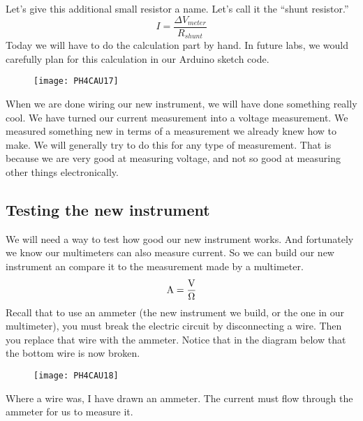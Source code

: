 Let's give this additional small resistor a name. Let's call it the
\textquotedblleft shunt resistor.\textquotedblright\ 
\begin{equation*}
I=\frac{\Delta V_{meter}}{R_{shunt}}
\end{equation*}%
Today we will have to do the calculation part by hand. In future labs, we
would carefully plan for this calculation in our Arduino sketch code.

\begin{figure}[h!]
\texttt{[image: PH4CAU17]}
\end{figure}

When we are done wiring our new instrument, we will have done something
really cool. We have turned our current measurement into a voltage
measurement. We measured something new in terms of a measurement we already
knew how to make. We will generally try to do this for any type of
measurement. That is because we are very good at measuring voltage, and not
so good at measuring other things electronically.

\subsection{Testing the new instrument}

We will need a way to test how good our new instrument works. And
fortunately we know our multimeters can also measure current. So we can
build our new instrument an compare it to the measurement made by a
multimeter. 
\begin{equation*}
\unit{A}=\frac{\unit{V}}{\unit{%
\Omega%
}}
\end{equation*}%
Recall that to use an ammeter (the new instrument we build, or the one in
our multimeter), you must break the electric circuit by disconnecting a
wire. Then you replace that wire with the ammeter. Notice that in the
diagram below that the bottom wire is now broken. \begin{figure}[h!]
\texttt{[image: PH4CAU18]}
\end{figure}Where a wire was, I have drawn an
ammeter. The current must flow through the ammeter for us to measure it.

